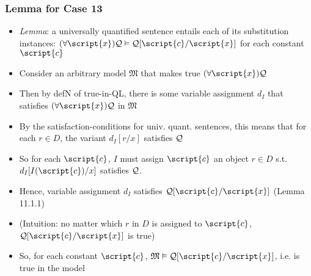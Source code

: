 \begin{frame}
\frametitle{Lemma for Case 13}

\begin{itemize}[<+->]

\item \emph{Lemma}: a universally quantified sentence entails each of its substitution instances: $\qt{\forall}{\script{x}}\metav{Q} \entails \metav{Q}\substitute{\script{x}}{\script{c}}$ for each constant $\script{c}$ %

\item Consider an arbitrary model $\mathfrak{M}$ that makes true $\qt{\forall}{\script{x}}\metav{Q}$
\item Then by defN of true-in-QL, there is some variable assignment $d_I$ that satisfies $\qt{\forall}{\script{x}}\metav{Q}$ in $\mathfrak{M}$
\item By the satisfaction-conditions for univ. quant. sentences, this means that for each $r \in D$, the variant $d_I [r/x]$ satisfies $\mathcal{Q}$

\item So for each $\script{c}$, $I$ must assign $\script{c}$ an object $r \in D$ s.t. $d_I [I(\script{c})/x]$ satisfies $\mathcal{Q}$. %

\item Hence, variable assignment $d_I$ satisfies $\metav{Q}\substitute{\script{x}}{\script{c}}$ (Lemma 11.1.1)

\item (Intuition: no matter which $r$ in $D$ is assigned to $\script{c}$, $\metav{Q}\substitute{\script{x}}{\script{c}}$ is true)
 
\item So, for each constant  $\script{c}$, $\mathfrak{M} \entails \metav{Q}\substitute{\script{x}}{\script{c}}$, i.e. is true in the model

\end{itemize}
\end{frame}


\iffalse

